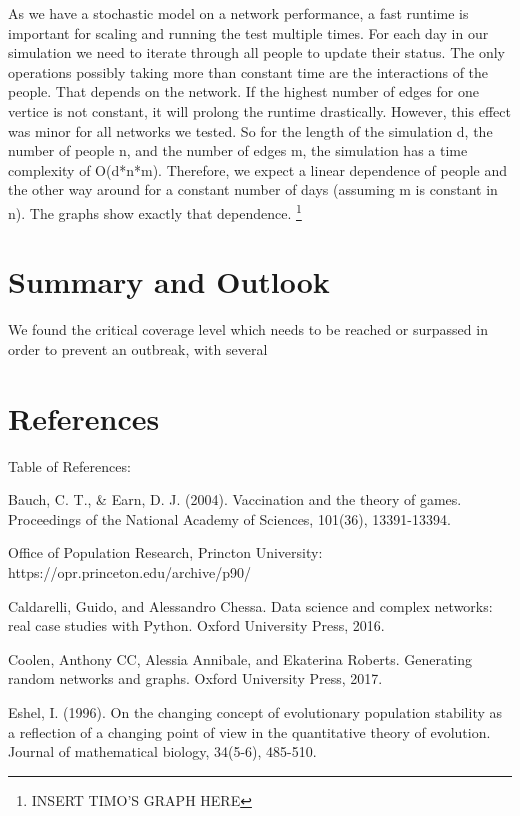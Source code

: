 \documentclass[11pt]{article}
\begin{document}
As we have a stochastic model on a network performance, a fast runtime is important for scaling and running the test multiple times. For each day in our simulation we need to iterate through all people to update their status. The only operations possibly taking more than constant time are the interactions of the people. That depends on the network. If the highest number of edges for one vertice is not constant, it will prolong the runtime drastically. However, this effect was minor for all networks we tested. So for the length of the simulation d, the number of people n, and the number of edges m, the simulation has a time complexity of O(d*n*m). Therefore, we expect a linear dependence of people and the other way around for a constant number of days (assuming m is constant in n). The graphs show exactly that dependence. \footnote{INSERT TIMO'S GRAPH HERE}



\section{Summary and Outlook}
We found the critical coverage level which needs to be reached or surpassed in order to prevent an outbreak, with several 

\section{References}
Table of References: 
\vspace{14px}

Bauch, C. T., \& Earn, D. J. (2004). Vaccination and the theory of games. Proceedings of the National Academy of Sciences, 101(36), 13391-13394.
\vspace{14px}

Office of Population Research, Princton University: https://opr.princeton.edu/archive/p90/

Caldarelli, Guido, and Alessandro Chessa. Data science and complex networks: real case studies with Python. Oxford University Press, 2016.

Coolen, Anthony CC, Alessia Annibale, and Ekaterina Roberts. Generating random networks and graphs. Oxford University Press, 2017.

Eshel, I. (1996). On the changing concept of evolutionary population stability as a reflection of a changing point of view in the quantitative theory of evolution. Journal of mathematical biology, 34(5-6), 485-510.
\vspace{14px}
\end{document}
